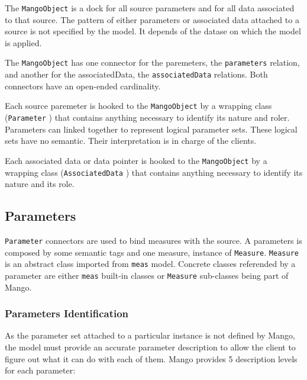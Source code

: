 \documentclass[11pt,a4paper]{ivoa}
\begin{document}
The \texttt{MangoObject} is a dock for all source parameters and for all data associated to that source.
The pattern of either parameters or associated data attached to a source is not specified by the model. It depends of the datase on which the model is applied.

The \texttt{MangoObject} has one connector for the paremeters,  the \texttt{parameters} relation, and another for the associatedData, the  \texttt{associatedData}  relations.
Both connectors have an open-ended cardinality.

Each source paremeter is hooked to the \texttt{MangoObject} by a wrapping class (\texttt{Parameter} ) that contains anything necessary to identify its nature and roler.
Parameters can linked together to represent logical parameter sets. These logical sets have no semantic. Their interpretation is in charge  of the clients.

Each associated data or data pointer is hooked to the \texttt{MangoObject} by a wrapping class (\texttt{AssociatedData} ) that contains anything necessary to identify its nature and its role.

\subsection{Parameters}

\texttt{Parameter}  connectors are used to bind measures with the source.
A parameters is composed  by some semantic tags and one measure, instance of \texttt{Measure}.
 \texttt{Measure} is an abstract class imported from \texttt{meas} model. 
Concrete classes referended by a parameter are either \texttt{meas}  built-in classes or  \texttt{Measure} sub-classes being part of Mango.

\subsubsection{Parameters Identification}
As the parameter set  attached to a particular instance is not defined by Mango, the model must provide an accurate parameter description to allow the client to figure out what it can do with each of them.
Mango provides 5 description levels for each parameter:
\end{document}
